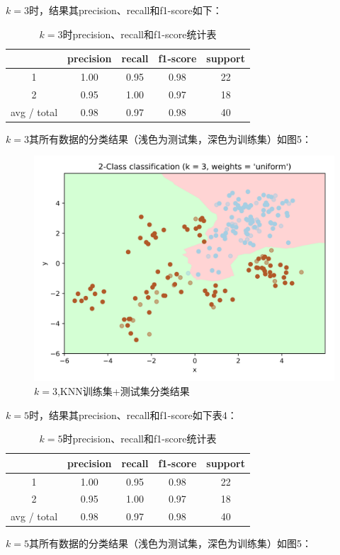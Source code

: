 \documentclass{article}
\newcommand{\hs}{\hspace{2em}}
\begin{document}
\hs $k=3$时，结果其precision、recall和f1-score如下：

\begin{table}[htbp]
	\caption{$k=3$时precision、recall和f1-score统计表}
	\centering
	\begin{tabular}{c|cccc}	
		& precision&recall&f1-score & support \\
		\hline
		1    &   1.00  &    0.95 &    0.98  &      22\\
		2    &   0.95    &  1.00   &   0.97    &    18 \\
		avg / total    &   0.98  &    0.97  &    0.98 &       40
	\end{tabular}	
\end{table}


\hs $k=3$其所有数据的分类结果（浅色为测试集，深色为训练集）如图5：

\begin{figure}[htbp]
	\centering
	\includegraphics[width=0.6\linewidth]{img//fig3.png}
	\caption{$k=3$,KNN训练集+测试集分类结果}
\end{figure}


\hs $k=5$时，结果其precision、recall和f1-score如下表4：

\begin{table}[H]
	\caption{$k=5$时precision、recall和f1-score统计表}
	\centering
	\begin{tabular}{c|cccc}	
		& precision&recall&f1-score & support \\
		\hline
		1    &   1.00  &    0.95 &    0.98  &      22\\
		2    &   0.95    &  1.00   &   0.97    &    18 \\
		avg / total    &   0.98  &    0.97  &    0.98 &       40
	\end{tabular}	
\end{table}


\hs $k=5$其所有数据的分类结果（浅色为测试集，深色为训练集）如图5：
\end{document}
